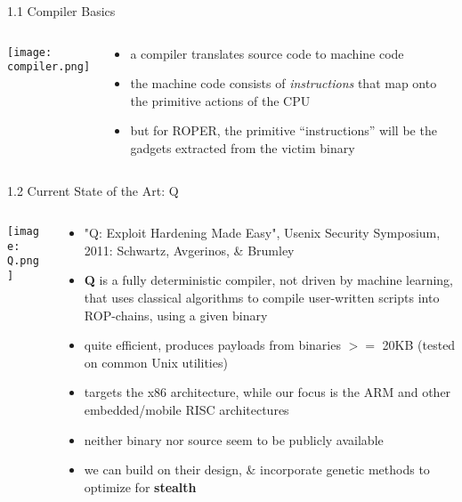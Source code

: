 \documentclass[9pt]{beamer}
\begin{document}
\begin{frame}{1.1 Compiler Basics}
\begin{columns}

\begin{column}{0.5\textwidth}
\texttt{[image: compiler.png]}

\end{column}
\begin{column}{.5\textwidth}

\begin{itemize}
\item a compiler translates source code to machine code
\item the machine code consists of \emph{instructions} that map onto the primitive actions of the CPU
\item but for ROPER, the primitive ``instructions'' will be the gadgets extracted from the victim binary
\end{itemize}

\end{column}

\end{columns}
\end{frame}
\begin{frame}{1.2 Current State of the Art: Q}

\begin{columns}
\begin{column}{.4\textwidth}

\texttt{[image: Q.png]}

\end{column}

\begin{column}{.60\textwidth}
\begin{itemize}
\item "Q: Exploit Hardening Made Easy", Usenix Security Symposium, 2011: Schwartz, Avgerinos, \& Brumley
\item \textbf{Q} is a fully deterministic compiler, not driven by machine learning, that uses classical algorithms to compile user-written scripts into ROP-chains, using a given binary
\item quite efficient, produces payloads from binaries $>=$ 20KB (tested on common Unix utilities)
\item targets the x86 architecture, while our focus is the ARM and other embedded/mobile RISC architectures
\item neither binary nor source seem to be publicly available
\item we can build on their design, \& incorporate genetic methods to optimize for \textbf{stealth}
\end{itemize}
\end{column}
\end{columns}

\end{frame}
\end{document}

